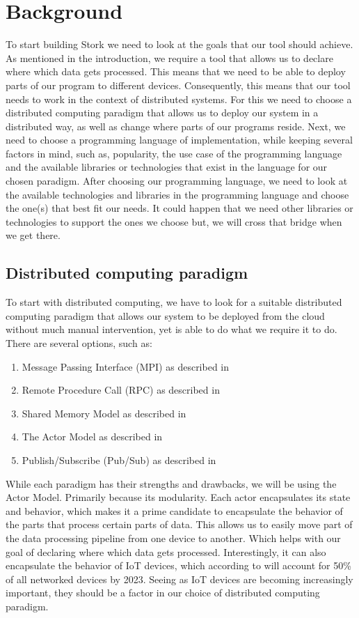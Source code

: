 \documentclass[a4paper]{article}
\begin{document}
\section{Background}
To start building Stork we need to look at the goals that our tool should achieve. As mentioned in the introduction, we require a tool that allows us to declare where which data gets processed. This means that we need to be able to deploy parts of our program to different devices. Consequently, this means that our tool needs to work in the context of distributed systems. For this we need to choose a distributed computing paradigm that allows us to deploy our system in a distributed way, as well as change where parts of our programs reside.
Next, we need to choose a programming language of implementation, while keeping several factors in mind, such as, popularity, the use case of the programming language and the available libraries or technologies that exist in the language for our chosen paradigm.
After choosing our programming language, we need to look at the available technologies and libraries in the programming language and choose the one(s) that best fit our needs. It could happen that we need other libraries or technologies to support the ones we choose but, we will cross that bridge when we get there.
\subsection{Distributed computing paradigm}
To start with distributed computing, we have to look for a suitable distributed computing paradigm that allows our system to be deployed from the cloud without much manual intervention, yet is able to do what we require it to do. There are several options, such as:
\begin{enumerate}
    \item Message Passing Interface (MPI) as described in \cite{MPI}
    \item Remote Procedure Call (RPC) as described in \cite{RPC}
    \item Shared Memory Model as described in \cite{SMM}
    \item The Actor Model as described in \cite{ActorModel}
    \item Publish/Subscribe (Pub/Sub) as described in \cite{PubSub}
\end{enumerate}
While each paradigm has their strengths and drawbacks, we will be using the Actor Model. Primarily because its modularity. Each actor encapsulates its state and behavior, which makes it a prime candidate to encapsulate the behavior of the parts that process certain parts of data. This allows us to easily move part of the data processing pipeline from one device to another. Which helps with our goal of declaring where which data gets processed. Interestingly, it can also encapsulate the behavior of IoT devices, which according to \cite{differentnetworkneedsiot} will account for 50\% of all networked devices by 2023. Seeing as IoT devices are becoming increasingly important, they should be a factor in our choice of distributed computing paradigm.
\end{document}
